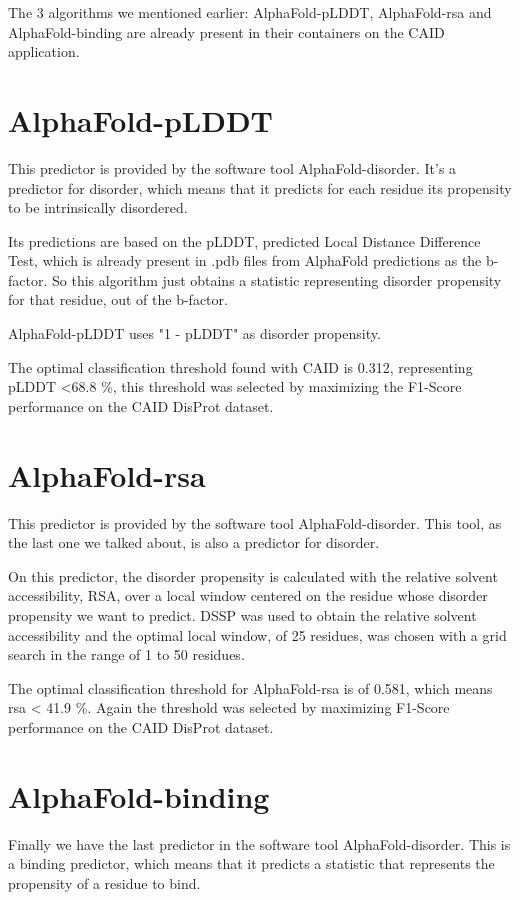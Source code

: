 The 3 algorithms we mentioned earlier: AlphaFold-pLDDT, AlphaFold-rsa and AlphaFold-binding are already present in their containers on the CAID application.

\section{AlphaFold-pLDDT}
This predictor is provided by the software tool AlphaFold-disorder. It's a predictor for disorder, which means that it predicts for each residue its propensity to be intrinsically disordered.

Its predictions are based on the pLDDT, predicted Local Distance Difference Test, which is already present in .pdb files from AlphaFold predictions as the b-factor. So this algorithm just obtains a statistic representing disorder propensity for that residue, out of the b-factor.

AlphaFold-pLDDT uses "1 - pLDDT" as disorder propensity. 

The optimal classification threshold found with CAID is 0.312, representing pLDDT <68.8 \%, this threshold was selected by maximizing the F1-Score performance on the CAID DisProt dataset.
\section{AlphaFold-rsa}
This predictor is provided by the software tool AlphaFold-disorder. This tool, as the last one we talked about, is also a predictor for disorder.

On this predictor, the disorder propensity is calculated with the relative solvent accessibility, RSA, over a local window centered on the residue whose disorder propensity we want to predict. DSSP was used to obtain the relative solvent accessibility and the optimal local window, of 25 residues, was chosen with a grid search in the range of 1 to 50 residues.

The optimal classification threshold for AlphaFold-rsa is of 0.581, which means rsa < 41.9 \%. Again the threshold was selected by maximizing F1-Score performance on the CAID DisProt dataset.

\pagebreak

\section{AlphaFold-binding}
Finally we have the last predictor in the software tool AlphaFold-disorder. This is a binding predictor, which means that it predicts a statistic that represents the propensity of a residue to bind.

